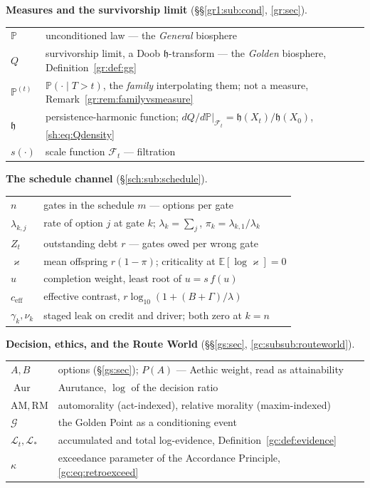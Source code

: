 \documentclass[11pt]{article}
\numberwithin{equation}{section}
\theoremstyle{plain}
\theoremstyle{definition}
\theoremstyle{remark}
\newcommand{\E}{\mathbb{E}}
\newcommand{\PP}{\mathbb{P}}
\newcommand{\Fc}{\mathcal{F}}
\newcommand{\Lc}{\mathcal{L}}
\newcommand{\hm}{\mathfrak{h}}
\begin{document}
\smallskip
\noindent\textbf{Measures and the survivorship limit}
(\S\S\ref{gr1:sub:cond}, \ref{gr:sec}).
\begin{center}\small
\begin{tabular}{@{}ll@{}}
\toprule
$\PP$ & unconditioned law --- the \emph{General} biosphere\\
$Q$ & survivorship limit, a Doob $\hm$-transform --- the \emph{Golden}
biosphere, Definition~\ref{gr:def:gg}\\
$\PP^{(t)}$ & $\PP(\cdot\mid T>t)$, the \emph{family} interpolating them;
not a measure, Remark~\ref{gr:rem:familyvsmeasure}\\
$\hm$ & persistence-harmonic function; $dQ/d\PP|_{\Fc_t}=\hm(X_t)/\hm(X_0)$,
\eqref{sh:eq:Qdensity}\\
$s(\cdot)$ & scale function \qquad $\Fc_t$ --- filtration\\
\bottomrule
\end{tabular}
\end{center}

\smallskip
\noindent\textbf{The schedule channel} (\S\ref{sch:sub:schedule}).
\begin{center}\small
\begin{tabular}{@{}ll@{}}
\toprule
$n$ & gates in the schedule \qquad $m$ --- options per gate\\
$\lambda_{k,j}$ & rate of option $j$ at gate $k$; $\lambda_k=\sum_j$,
$\pi_k=\lambda_{k,1}/\lambda_k$\\
$Z_t$ & outstanding debt \qquad $r$ --- gates owed per wrong gate\\
$\varkappa$ & mean offspring $r(1-\pi)$; criticality at
$\E[\log\varkappa]=0$\\
$u$ & completion weight, least root of $u=s\,f(u)$\\
$c_{\mathrm{eff}}$ & effective contrast, $r\log_{10}(1+(B+\Gamma)/\lambda)$\\
$\gamma_k,\nu_k$ & staged leak on credit and driver; both zero at $k=n$\\
\bottomrule
\end{tabular}
\end{center}

\smallskip
\noindent\textbf{Decision, ethics, and the Route World}
(\S\S\ref{gs:sec}, \ref{gc:subsub:routeworld}).
\begin{center}\small
\begin{tabular}{@{}ll@{}}
\toprule
$A,B$ & options (\S\ref{gs:sec}); $P(A)$ --- Aethic weight, read as
attainability\\
$\operatorname{Aur}$ & Aurutance, $\log$ of the decision ratio\\
$\mathrm{AM},\mathrm{RM}$ & automorality (act-indexed), relative morality
(maxim-indexed)\\
$\mathcal G$ & the Golden Point as a conditioning event\\
$\Lc_t,\Lc_\ast$ & accumulated and total log-evidence,
Definition~\ref{gc:def:evidence}\\
$\kappa$ & exceedance parameter of the Accordance Principle,
\eqref{gc:eq:retroexceed}\\
\bottomrule
\end{tabular}
\end{center}
\end{document}
